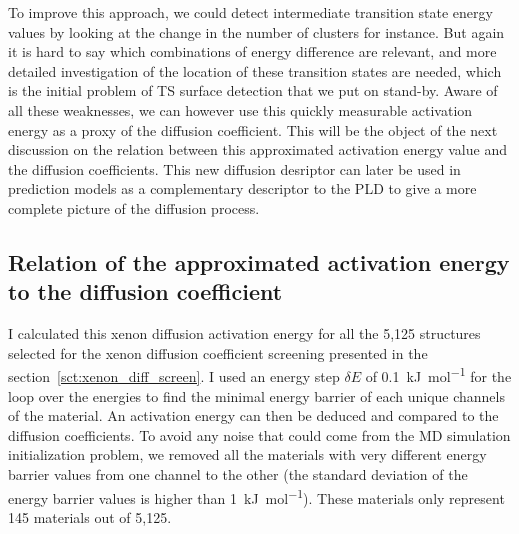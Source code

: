 \documentclass[main]{subfiles}
\begin{document}
To improve this approach, we could detect intermediate transition state energy values by looking at the change in the number of clusters for instance. But again it is hard to say which combinations of energy difference are relevant, and more detailed investigation of the location of these transition states are needed, which is the initial problem of TS surface detection that we put on stand-by. Aware of all these weaknesses, we can however use this quickly measurable activation energy as a proxy of the diffusion coefficient. 
This will be the object of the next discussion on the relation between this approximated activation energy value and the diffusion coefficients. This new diffusion desriptor can later be used in prediction models as a complementary descriptor to the PLD to give a more complete picture of the diffusion process. 

\subsection{Relation of the approximated activation energy to the diffusion coefficient}

I calculated this xenon diffusion activation energy for all the 5,125 structures selected for the xenon diffusion coefficient screening presented in the section~\ref{sct:xenon_diff_screen}. I used an energy step $\delta E$ of \SI{0.1}{\kJ\per\mol} for the loop over the energies to find the minimal energy barrier of each unique channels of the material. An activation energy can then be deduced and compared to the diffusion coefficients. To avoid any noise that could come from the MD simulation initialization problem, we removed all the materials with very different energy barrier values from one channel to the other (the standard deviation of the energy barrier values is higher than \SI{1}{\kJ\per\mol}). These materials only represent 145 materials out of 5,125.
\end{document}
